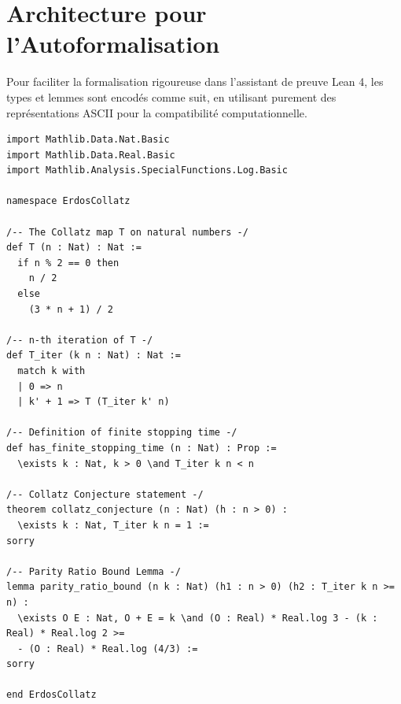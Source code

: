 \documentclass[12pt,a4paper]{article}
\begin{document}
\section{Architecture pour l'Autoformalisation}

Pour faciliter la formalisation rigoureuse dans l'assistant de preuve Lean 4, les types et lemmes sont encod\'es comme suit, en utilisant purement des repr\'esentations ASCII pour la compatibilit\'e computationnelle.

\begin{verbatim}
import Mathlib.Data.Nat.Basic
import Mathlib.Data.Real.Basic
import Mathlib.Analysis.SpecialFunctions.Log.Basic

namespace ErdosCollatz

/-- The Collatz map T on natural numbers -/
def T (n : Nat) : Nat :=
  if n % 2 == 0 then
    n / 2
  else
    (3 * n + 1) / 2

/-- n-th iteration of T -/
def T_iter (k n : Nat) : Nat :=
  match k with
  | 0 => n
  | k' + 1 => T (T_iter k' n)

/-- Definition of finite stopping time -/
def has_finite_stopping_time (n : Nat) : Prop :=
  \exists k : Nat, k > 0 \and T_iter k n < n

/-- Collatz Conjecture statement -/
theorem collatz_conjecture (n : Nat) (h : n > 0) :
  \exists k : Nat, T_iter k n = 1 :=
sorry

/-- Parity Ratio Bound Lemma -/
lemma parity_ratio_bound (n k : Nat) (h1 : n > 0) (h2 : T_iter k n >= n) :
  \exists O E : Nat, O + E = k \and (O : Real) * Real.log 3 - (k : Real) * Real.log 2 >=
  - (O : Real) * Real.log (4/3) :=
sorry

end ErdosCollatz
\end{verbatim}
\end{document}
